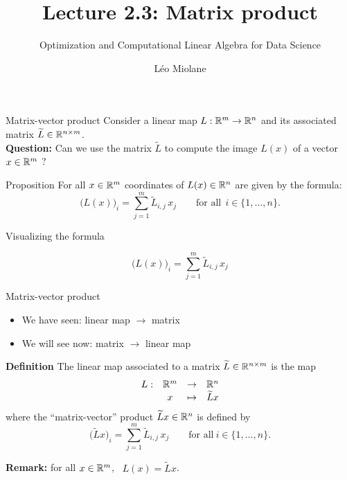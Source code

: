 \documentclass{beamer}
\title{Lecture 2.3: Matrix product}
\subtitle{Optimization and Computational Linear Algebra for Data Science}
\author{Léo Miolane}
\date{}
\begin{document}
\setcounter{showProgressBar}{0}
\setcounter{showSlideNumbers}{0}

\frame{\titlepage}


\setcounter{framenumber}{0}
\setcounter{showSlideNumbers}{1}

\begin{frame}[t]{Matrix-vector product}
	Consider a linear map $L:\mathbb{R}^m \to \mathbb{R}^n$ and its associated matrix $\widetilde{L} \in \mathbb{R}^{n \times m}$.
	\\
	\vspace{0.3cm}
	\textbf{Question:} Can we use the matrix $\widetilde{L}$ to compute the image $L(x)$ of a vector $x\in\mathbb{R}^m$ ?
	\vspace{0.3cm}

	\begin{block}{Proposition}
		For all $x\in\mathbb{R}^m$ coordinates of $L(x) \in \mathbb{R}^n$ are given by the formula:
		$$
		\big(L(x)\big)_i = \sum_{j=1}^m \widetilde{L}_{i,j} \, x_j \qquad \text{for all} \ \ i \in \{1, \dots, n\}.
		$$
	\end{block}
\end{frame}
\begin{frame}[t]{Visualizing the formula}
	\vspace{-0.9cm}
	\begin{exampleblock}{}
		\vspace{-0.4cm}
		$$
		\big(L(x)\big)_i = \sum_{j=1}^m \widetilde{L}_{i,j} \, x_j
		$$
		\vspace{-0.4cm}
	\end{exampleblock}
\end{frame}

\begin{frame}[t]{Matrix-vector product}
	\begin{itemize}
		\item We have seen: \quad linear map $\to$ matrix
		\item We will see now: \quad matrix $\to$ linear map
	\end{itemize}

	\begin{block}{\bf Definition}
		The linear map associated to a matrix $\widetilde{L} \in \mathbb{R}^{n \times m}$ is the map
		$$
		\begin{array}{cccc}
			L:& \mathbb{R}^m & \to & \mathbb{R}^n \\
			  & x & \mapsto & \widetilde{L}x
		\end{array}
		$$
		where the ``matrix-vector'' product $\widetilde{L}x \in \mathbb{R}^n$ is defined by
		$$
		\big(\widetilde{L}x\big)_i = \sum_{j=1}^m \widetilde{L}_{i,j} \, x_j \qquad \text{for all} \ i \in \{1, \dots, n\}.
		$$
		\vspace{-0.5cm}
	\end{block}
	\vspace{0.2cm}
	\textbf{Remark:} for all $x\in\mathbb{R}^m$, \ $L(x) = \widetilde{L}x$.
\end{frame}
\end{document}
